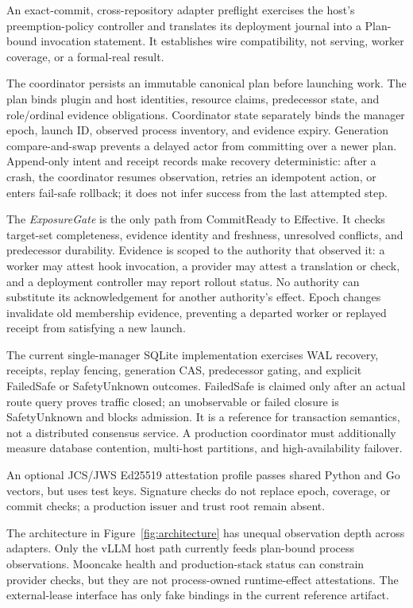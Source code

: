 \documentclass[letterpaper,twocolumn,10pt]{article}
\begin{document}
An exact-commit, cross-repository adapter preflight exercises the host's
preemption-policy controller and translates its deployment journal into a
Plan-bound invocation statement. It establishes wire compatibility, not
serving, worker coverage, or a formal-real result.

The coordinator persists an immutable canonical plan before launching work.
The plan binds plugin and host identities, resource claims, predecessor state,
and role/ordinal evidence obligations.  Coordinator state separately binds the
manager epoch, launch ID, observed process inventory, and evidence expiry.
Generation compare-and-swap prevents a delayed actor from committing over a
newer plan.
Append-only intent and receipt records make recovery deterministic: after a
crash, the coordinator resumes observation, retries an idempotent action, or
enters fail-safe rollback; it does not infer success from the last attempted
step.

The \emph{ExposureGate} is the only path from CommitReady to Effective.  It
checks target-set completeness, evidence identity and freshness, unresolved
conflicts, and predecessor durability.  Evidence is scoped to the authority
that observed it: a worker may attest hook invocation, a provider may attest a
translation or check, and a deployment controller may report rollout status.
No authority can substitute its acknowledgement for another authority's
effect.  Epoch changes invalidate old membership evidence, preventing a
departed worker or replayed receipt from satisfying a new launch.

The current single-manager SQLite implementation exercises WAL recovery,
receipts, replay fencing, generation CAS, predecessor gating, and explicit
FailedSafe or SafetyUnknown outcomes.  FailedSafe is claimed only after an
actual route query proves traffic closed; an unobservable or failed closure is
SafetyUnknown and blocks admission.  It is a reference for transaction semantics, not a
distributed consensus service.  A production coordinator must additionally
measure database contention, multi-host partitions, and high-availability
failover.

An optional JCS/JWS Ed25519 attestation profile passes shared Python and Go
vectors, but uses test keys. Signature checks do not replace epoch, coverage,
or commit checks; a production issuer and trust root remain absent.

The architecture in Figure~\ref{fig:architecture} has unequal observation
depth across adapters. Only the vLLM host path currently feeds
plan-bound process observations. Mooncake health and production-stack status
can constrain provider checks, but they are not process-owned runtime-effect
attestations. The external-lease interface has only fake bindings in the
current reference artifact.
\end{document}
